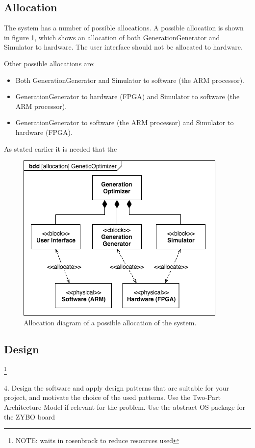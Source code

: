 \subsection{Allocation}
The system has a number of possible allocations. A possible allocation is shown in figure \ref{fig:allocation}, which shows an allocation of both GenerationGenerator and Simulator to hardware. The user interface should not be allocated to hardware.

Other possible allocations are: \begin{itemize} 
\item Both GenerationGenerator and Simulator to software (the ARM processor).
\item GenerationGenerator to hardware (FPGA) and Simulator to software (the ARM processor).
\item GenerationGenerator to software (the ARM processor) and Simulator to hardware (FPGA).
\end{itemize}

As stated earlier it is needed that the 

\begin{figure}[htbp]
\begin{centering}
\includegraphics[width=0.9\linewidth]{../diagrams/allocation.png}
\caption{Allocation diagram of a possible allocation of the system.}
\label{fig:allocation}
\end{centering}
\end{figure}

\subsection{Design}
\footnote{\color{red}NOTE: waits in rosenbrock to reduce resources used}

\begin{framed}
4. Design the software and apply design patterns that are suitable for your project, and motivate the choice of the used patterns. Use the Two-Part Architecture Model if relevant for the problem. Use the abstract OS package for the ZYBO board
\end{framed}